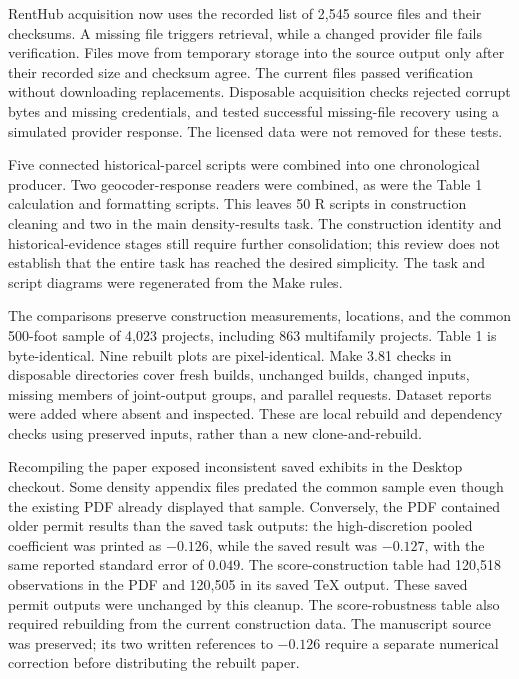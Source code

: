 RentHub acquisition now uses the recorded list of 2,545 source files and their
checksums. A missing file triggers retrieval, while a changed provider file fails
verification. Files move from temporary storage into the source output only after
their recorded size and checksum agree. The current files passed verification
without downloading replacements. Disposable acquisition checks rejected corrupt
bytes and missing credentials, and tested successful missing-file recovery using
a simulated provider response. The licensed data were not removed for these tests.

Five connected historical-parcel scripts were combined into one chronological
producer. Two geocoder-response readers were combined, as were the Table 1
calculation and formatting scripts. This leaves 50 R scripts in construction
cleaning and two in the main density-results task. The construction identity
and historical-evidence stages still require further consolidation; this review
does not establish that the entire task has reached the desired simplicity.
The task and script diagrams were regenerated from the Make rules.

The comparisons preserve construction measurements, locations, and the common
500-foot sample of 4,023 projects, including 863 multifamily projects. Table 1
is byte-identical. Nine rebuilt plots are pixel-identical. Make 3.81 checks in
disposable directories cover fresh builds, unchanged builds, changed inputs,
missing members of joint-output groups, and parallel requests. Dataset reports
were added where absent and inspected. These are local rebuild and dependency
checks using preserved inputs, rather than a new clone-and-rebuild.

Recompiling the paper exposed inconsistent saved exhibits in the Desktop
checkout. Some density appendix files predated the common sample even though
the existing PDF already displayed that sample. Conversely, the PDF contained
older permit results than the saved task outputs: the high-discretion pooled
coefficient was printed as $-0.126$, while the saved result was $-0.127$, with
the same reported standard error of $0.049$. The score-construction table had
120,518 observations in the PDF and 120,505 in its saved TeX output. These
saved permit outputs were unchanged by this cleanup. The score-robustness table
also required rebuilding from the current construction data. The manuscript
source was preserved; its two written references to $-0.126$ require a separate
numerical correction before distributing the rebuilt paper.


